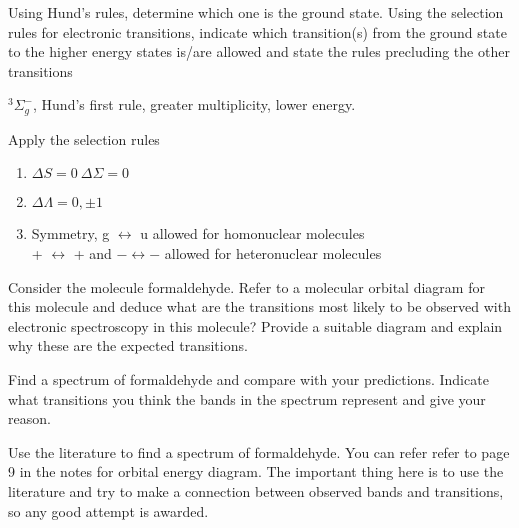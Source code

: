 \documentclass[12pt]{exam}
\begin{document}
\begin{questions}
Using Hund’s rules, determine which one is the ground state. Using the selection rules for electronic transitions, indicate which transition(s) from the ground state to the higher energy states is/are allowed and state the rules precluding the other transitions

\begin{solution}
\(^3\Sigma_g^-\), Hund's first rule, greater multiplicity, lower energy.

Apply the selection rules

\begin{enumerate}
\item \(\Delta S = 0 \ \Delta\Sigma = 0\)
\item \(\Delta\Lambda = 0, \pm1\)
\item Symmetry, g \(\leftrightarrow\) u allowed for homonuclear molecules\\
	+ \(\leftrightarrow\) + and \(- \leftrightarrow -\) allowed for heteronuclear molecules
\end{enumerate}
\end{solution}

\question Consider the molecule formaldehyde. Refer to a molecular orbital diagram for this molecule and deduce what are the transitions most likely to be observed with electronic spectroscopy in this molecule? Provide a suitable diagram and explain why these are the expected transitions.

Find a spectrum of formaldehyde and compare with your predictions.  Indicate what transitions you think the bands in the spectrum represent and give your reason.


\begin{solution}
Use the literature to find a spectrum of formaldehyde. You can refer refer to page 9 in the notes for orbital energy diagram. The important thing here is to use the literature and try to make a connection between observed bands and transitions, so any good attempt is awarded.
\end{solution}

\end{questions}
\end{document}
